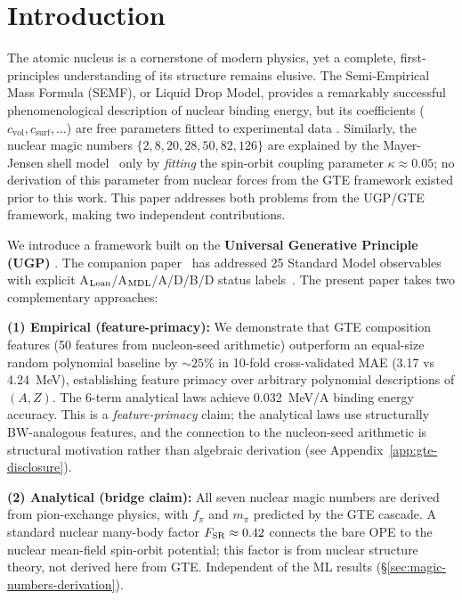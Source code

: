 \documentclass[9pt,twocolumn]{extarticle}
\begin{document}
\section{Introduction}
The atomic nucleus is a cornerstone of modern physics, yet a complete, first-principles understanding of its structure remains elusive. The Semi-Empirical Mass Formula (SEMF), or Liquid Drop Model, provides a remarkably successful phenomenological description of nuclear binding energy, but its coefficients ($c_{\text{vol}}, c_{\text{surf}}, \dots$) are free parameters fitted to experimental data \cite{Bethe1936}. Similarly, the nuclear magic numbers $\{2, 8, 20, 28, 50, 82, 126\}$ are explained by the Mayer-Jensen shell model~\cite{MayerJensen1949} only by \emph{fitting} the spin-orbit coupling parameter $\kappa \approx 0.05$; no derivation of this parameter from nuclear forces from the GTE framework existed prior to this work. This paper addresses both problems from the UGP/GTE framework, making two independent contributions.

We introduce a framework built on the \textbf{Universal Generative Principle (UGP)} \cite{SpivackUGPFormalization,ugp-lean}. The companion paper~\cite{SpivackSM} has addressed 25 Standard Model observables with explicit A$_{\rm Lean}$/A$_{\rm MDL}$/A/D/B/D status labels~\cite{Spivack2026_SM_UGP}. The present paper takes two complementary approaches:

\textbf{(1) Empirical (feature-primacy):} We demonstrate that GTE composition features (50 features from nucleon-seed arithmetic) outperform an equal-size random polynomial baseline by $\sim\!25\%$ in 10-fold cross-validated MAE (3.17 vs 4.24~MeV), establishing feature primacy over arbitrary polynomial descriptions of $(A,Z)$. The 6-term analytical laws achieve 0.032~MeV/A binding energy accuracy. This is a \emph{feature-primacy} claim; the analytical laws use structurally BW-analogous features, and the connection to the nucleon-seed arithmetic is structural motivation rather than algebraic derivation (see Appendix~\ref{app:gte-disclosure}).

\textbf{(2) Analytical (bridge claim):} All seven nuclear magic numbers are derived from pion-exchange physics, with $f_\pi$ and $m_\pi$ predicted by the GTE cascade. A standard nuclear many-body factor $F_{\rm SR} \approx 0.42$ connects the bare OPE to the nuclear mean-field spin-orbit potential; this factor is from nuclear structure theory, not derived here from GTE. Independent of the ML results (\S\ref{sec:magic-numbers-derivation}).
\end{document}
